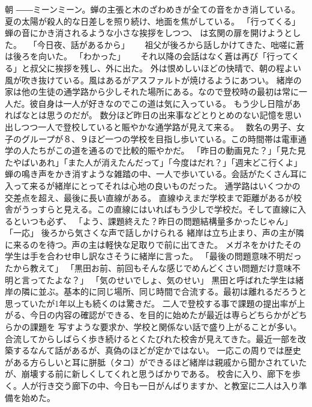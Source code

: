 \documentclass[uplatex]{utbook}
\begin{document}
朝
――ミーンミーン。蝉の主張と木のざわめきが全ての音をかき消している。夏の太陽が殺人的な日差しを照り続け、地面を焦がしている。
「行ってくる」　　
蝉の音にかき消されるような小さな挨拶をしつつ、 は玄関の扉を開けようとした。　
「今日夜、話があるから」　　
祖父が後ろから話しかけてきた、咄嗟に蒼は後ろを向いた。
「わかった」　　
それ以降の会話はなく蒼は再び「行ってくる」と叔父に挨拶を残し、外に出た。
外は恨めしいほどの快晴で、朝の程よい風が吹き抜けている。風はあるがアスファルトが焼けるようにあつい。
緒岸の家は他の生徒の通学路から少しそれた場所にある。なので登校時の最初は常に一人だ。彼自身は一人が好きなのでこの道は気に入っている。
もう少し日陰があればなとは思うのだが。
数分ほど昨日の出来事などとりとめのない記憶を思い出しつつ一人で登校していると賑やかな通学路が見えて来る。　
数名の男子、女子のグループが８、９ほど一つの学校を目指し歩いている。この時間帯は電車通学の人たちがこの道を通るので比較的賑やかだ。
「昨日の動画見た？」「見た見たやばいあれ」「また人が消えたんだって」「今度はだれ？」「週末どこ行くよ」
蝉の鳴き声をかき消すような雑踏の中、一人で歩いている。会話がたくさん耳に入って来るが緒岸にとってそれは心地の良いものだった。
通学路はいくつかの交差点を超え、最後に長い直線がある。
直線ゆえまだ学校まで距離があるが校舎がうっすらと見える。この直線にはいればもう少しで学校だ。そして直線に入るといつも必ず、
「よう、課題終えた？昨日の問題結構量多かったじゃん」
「一応」
後ろから気さくな声で話しかけられる
緒岸は立ち止まり、声の主が隣に来るのを待つ。声の主は軽快な足取りで前に出てきた。
メガネをかけたその学生は手を合わせ申し訳なさそうに緒岸に言った。
「最後の問題意味不明だったから教えて」
「黒田お前、前回もそんな感じでめんどくさい問題だけ意味不明と言ってたよな？」
「気のせいでしょ、気のせい」
黒田と呼ばれた学生は緒岸の隣に並ぶ。基本的に同じ場所、同じ時間で合流する。最初は離れるだろうと思っていたが1年以上も続くのは驚きだ。
二人で登校する事で課題の提出率が上がる、今日の内容の確認ができる、を目的に始めたが最近は専らどちらかがどちらかの課題を
写すような要求か、学校と関係ない話で盛り上がることが多い。
合流してからしばらく歩き続けるとくたびれた校舎が見えてきた。最近一部を改築するなんて話があるが、真偽のほどが定かではない。
一応この周りでは歴史がある方らしいと耳に胼胝（タコ）ができるほど緒岸は親戚から聞かされていたが、崩壊する前に新しくしてくれと思うばかりである。
校舎に入り、廊下を歩く。人が行き交う廊下の中、今日も一日がんばりますか、と教室に二人は入り準備を始めた。
\end{document}
